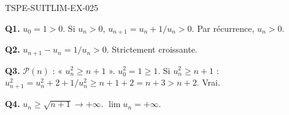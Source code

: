 \begin{corrige}{TSPE-SUITLIM-EX-025}

\textbf{Q1.} $u_0=1>0$. Si $u_n>0$, $u_{n+1}=u_n+1/u_n>0$. Par récurrence, $u_n>0$.

\textbf{Q2.} $u_{n+1}-u_n=1/u_n>0$. Strictement croissante.

\textbf{Q3.} $\mathcal{P}(n)$ : « $u_n^2 \geq n+1$ ». $u_0^2=1 \geq 1$. Si $u_n^2 \geq n+1$ : $u_{n+1}^2 = u_n^2 + 2 + 1/u_n^2 \geq n+1+2 = n+3 > n+2$. Vrai.

\textbf{Q4.} $u_n \geq \sqrt{n+1} \to +\infty$. $\boxed{\lim u_n = +\infty}$.

\end{corrige}
